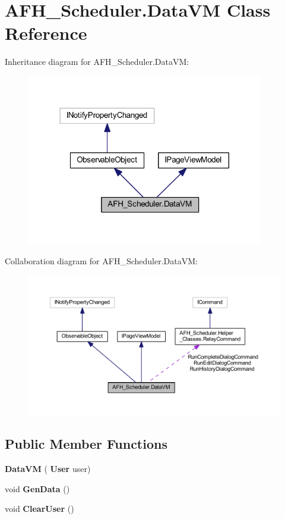 \section{A\+F\+H\+\_\+\+Scheduler.\+Data\+VM Class Reference}
\label{class_a_f_h___scheduler_1_1_data_v_m}


Inheritance diagram for A\+F\+H\+\_\+\+Scheduler.\+Data\+VM\+:
\nopagebreak
\begin{figure}[H]
\begin{center}
\leavevmode
\includegraphics[width=293pt]{class_a_f_h___scheduler_1_1_data_v_m__inherit__graph}
\end{center}
\end{figure}


Collaboration diagram for A\+F\+H\+\_\+\+Scheduler.\+Data\+VM\+:
\nopagebreak
\begin{figure}[H]
\begin{center}
\leavevmode
\includegraphics[width=350pt]{class_a_f_h___scheduler_1_1_data_v_m__coll__graph}
\end{center}
\end{figure}
\subsection*{Public Member Functions}
\begin{DoxyCompactItemize}
\item 
\textbf{ Data\+VM} (\textbf{ User} user)
\item 
void \textbf{ Gen\+Data} ()
\item 
void \textbf{ Clear\+User} ()
\end{DoxyCompactItemize}
